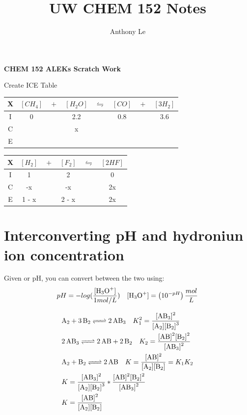 \documentclass{article}  %
\title{UW CHEM 152 Notes}
\author{Anthony Le}
\begin{document}
\pagestyle{fancy}
\fancyhead{}

\begin{center}
    \LARGE{\textbf{CHEM 152 ALEKs Scratch Work}}
\end{center}

Create ICE Table \\
\begin{tabular}{c|c@{}c@{}c@{}c@{}c@{}c@{}c}
    \hline
    X   & $[CH_4]$ & ${}+{}$ & $[H_2O]$ & ${}\leftrightharpoons{}$ & $[CO]$ & ${}+{}$ & $[3H_2]$ \\
    \hline
    I   &  0    && 2.2    &&  0.8   && 3.6  \\
    C   &      &&  x   &&     &&   \\
    E   &      &&     &&     &&   \\      
\end{tabular}
 
\begin{tabular}{c|c@{}c@{}c@{}c@{}c}
    \hline
    X   &   $[H_2]$ & ${}+{}$ & $[F_2]$ & ${}\leftrightharpoons{}$ & $[2HF]$ \\
    \hline
    I   &       1       &&   2                            &&  0       \\
    C   &       -x      &&   -x                           &&  2x      \\
    E   &       1 - x     &&   2 - x                        &&  2x      \\
    \hline
  \end{tabular}

\section*{Interconverting pH and hydroniun ion concentration}
Given \ce{[H3O^+]} or pH, you can convert between the two using:
\begin{equation*}
    \begin{aligned}
        pH = - log(\frac{\ce{[H3O^+]}}{1 mol/L}) \quad \ce{[H3O^+]} = \left(10^{-pH}\right) \frac{mol}{L}
    \end{aligned}
\end{equation*}


\begin{equation*}
    \begin{aligned}
        &\ce{A2 + 3 B2 <=> 2 AB_3} \quad K_1^2 = \ce{\frac{[AB3]^2}{[A2][B2]^3}} \\
        &\ce{2AB3 <=> 2AB + 2B2} \quad K_2 = \ce{\frac{[AB]^2[B2]^2}{[AB3]^2}} \\
        &\ce{A2 + B2 <=> 2 AB} \quad K = \ce{\frac{[AB]^2}{[A2][B2]}} = K_1K_2 \\
        &K = \ce{\frac{[AB3]^2}{[A2][B2]^3}} * \ce{\frac{[AB]^2[B2]^2}{[AB3]^2}} \\
        &K = \ce{\frac{[AB]^2}{[A2][B2]}}
    \end{aligned}
\end{equation*}
\end{document}
